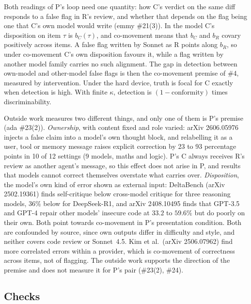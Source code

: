 \documentclass{article}
\begin{document}
Both readings of P's loop need one quantity: how C's verdict on the same
diff responds to a false flag in R's review, and whether that depends on
the flag being one that C's own model would write (emmy \#21(3)). In the
model C's disposition on item $\tau$ is $b_C(\tau)$, and co-movement means
that $b_C$ and $b_R$ covary positively across items. A false flag written
by Sonnet as R points along $b_R$, so under co-movement C's own disposition
favours it, while a flag written by another model family carries no such
alignment. The gap in detection between own-model and other-model false
flags is then the co-movement premise of \#4, measured by intervention.
Under the hard device, truth is focal for C exactly when detection is
high. With finite $\kappa$, detection is $(1-\text{conformity})$ times
discriminability.

Outside work measures two different things, and only one of them is P's
premise (ada \#23(2)). \emph{Ownership}, with content fixed and role
varied: arXiv 2606.05976 injects a false claim into a model's own thought
block, and relabelling it as a user, tool or memory message raises
explicit correction by 23 to 93 percentage points in 10 of 12 settings
(9 models, maths and logic). P's C always receives R's review as another
agent's message, so this effect does not arise in P, and results that
models cannot correct themselves overstate what carries over.
\emph{Disposition}, the model's own kind of error shown as external
input: DeltaBench (arXiv 2502.19361) finds self-critique below
cross-model critique for three reasoning models, $36\%$ below for
DeepSeek-R1, and arXiv 2408.10495 finds that GPT-3.5 and GPT-4 repair
other models' insecure code at $33.2$ to $59.6\%$ but do poorly on their
own. Both point towards co-movement in P's presentation condition. Both
are confounded by source, since own outputs differ in difficulty and
style, and neither covers code review or Sonnet~4.5. Kim et al.\ (arXiv
2506.07962) find more correlated errors within a provider, which is
co-movement of correctness across items, not of flagging. The outside
work supports the direction of the premise and does not measure it for
P's pair (\#23(2), \#24).

\subsection{Checks}
\end{document}
